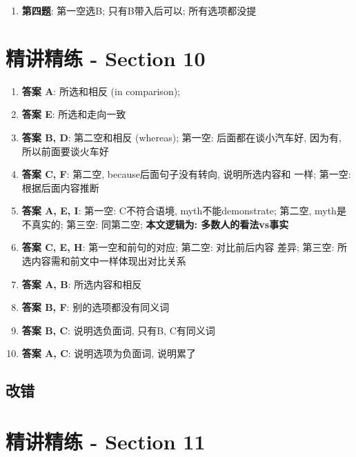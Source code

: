     \begin{enumerate}
      \item \textbf{第四题}: 第一空选B; 只有B带入后可以; 所有选项都没提
    \end{enumerate}

\section{精讲精练 - Section 10}

  \begin{enumerate}
    \item \textbf{答案 A}: 所选和相反 (in comparison);
    \item \textbf{答案 E}: 所选和走向一致
    \item \textbf{答案 B, D}: 第二空和相反 (whereas);
    第一空: 后面都在谈小汽车好, 因为有, 所以前面要谈火车好
    \item \textbf{答案 C, F}: 第二空, because后面句子没有转向, 说明所选内容和
    一样; 第一空: 根据后面内容推断
    \item \textbf{答案 A, E, I}: 第一空: C不符合语境, myth不能demonstrate; 第二空,
    myth是不真实的; 第三空: 同第二空; \textbf{本文逻辑为: 多数人的看法vs事实}
    \item \textbf{答案 C, E, H}: 第一空和前句的对应; 第二空: 对比前后内容
    差异; 第三空: 所选内容需和前文中一样体现出对比关系
    \item \textbf{答案 A, B}: 所选内容和相反
    \item \textbf{答案 B, F}: 别的选项都没有同义词
    \item \textbf{答案 B, C}: 说明选负面词, 只有B, C有同义词
    \item \textbf{答案 A, C}: 说明选项为负面词, 说明累了
  \end{enumerate}

  \subsection{改错}

\section{精讲精练 - Section 11}

